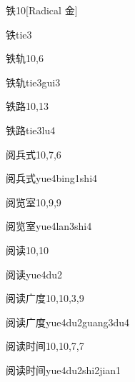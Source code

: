 \begin{entry}{铁}{10}[Radical 金]
  \begin{phonetics}{铁}{tie3}
  \end{phonetics}
\end{entry}

\begin{entry}{铁轨}{10,6}
  \begin{phonetics}{铁轨}{tie3gui3}
  \end{phonetics}
\end{entry}

\begin{entry}{铁路}{10,13}
  \begin{phonetics}{铁路}{tie3lu4}
  \end{phonetics}
\end{entry}

\begin{entry}{阅兵式}{10,7,6}
  \begin{phonetics}{阅兵式}{yue4bing1shi4}
  \end{phonetics}
\end{entry}

\begin{entry}{阅览室}{10,9,9}
  \begin{phonetics}{阅览室}{yue4lan3shi4}
  \end{phonetics}
\end{entry}

\begin{entry}{阅读}{10,10}
  \begin{phonetics}{阅读}{yue4du2}
  \end{phonetics}
\end{entry}

\begin{entry}{阅读广度}{10,10,3,9}
  \begin{phonetics}{阅读广度}{yue4du2guang3du4}
  \end{phonetics}
\end{entry}

\begin{entry}{阅读时间}{10,10,7,7}
  \begin{phonetics}{阅读时间}{yue4du2shi2jian1}
  \end{phonetics}
\end{entry}

